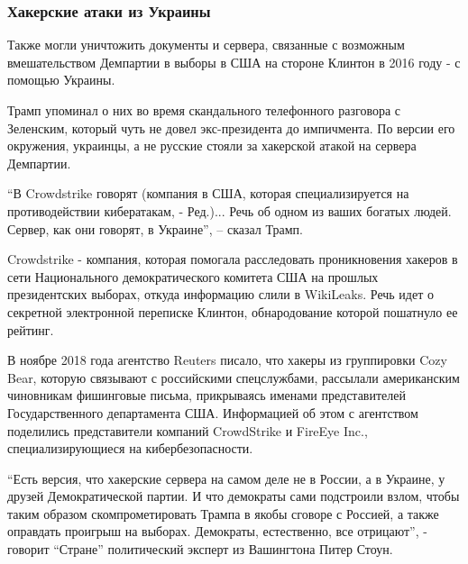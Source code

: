  
 
 
 
 

\subsubsection{Хакерские атаки из Украины}
\label{sec:18_02_2022.stz.news.ua.strana.1.dokumenty_usa_posolstvo_kiev.2.hakerskie_ataki}

Также могли уничтожить документы и сервера, связанные с возможным
вмешательством Демпартии в выборы в США на стороне Клинтон в 2016 году - с
помощью Украины.

Трамп упоминал о них во время скандального телефонного разговора с Зеленским,
который чуть не довел экс-президента до импичмента. По версии его окружения,
украинцы, а не русские стояли за хакерской атакой на сервера Демпартии.

\enquote{В Crowdstrike говорят (компания в США, которая специализируется на
противодействии кибератакам, - Ред.)... Речь об одном из ваших богатых людей.
Сервер, как они говорят, в Украине}, – сказал Трамп.

Crowdstrike - компания, которая помогала расследовать проникновения хакеров в
сети Национального демократического комитета США на прошлых президентских
выборах, откуда информацию слили в WikiLeaks. Речь идет о секретной электронной
переписке Клинтон, обнародование которой пошатнуло ее рейтинг.

В ноябре 2018 года агентство Reuters писало, что хакеры из группировки Cozy
Bear, которую связывают с российскими спецслужбами, рассылали американским
чиновникам фишинговые письма, прикрываясь именами представителей
Государственного департамента США. Информацией об этом с агентством поделились
представители компаний CrowdStrike и FireEye Inc., специализирующиеся на
кибербезопасности.

\enquote{Есть версия, что хакерские сервера на самом деле не в России, а в Украине, у
друзей Демократической партии. И что демократы сами подстроили взлом, чтобы
таким образом скомпрометировать Трампа в якобы сговоре с Россией, а также
оправдать проигрыш на выборах. Демократы, естественно, все отрицают}, - говорит
\enquote{Стране} политический эксперт из Вашингтона Питер Стоун.  

